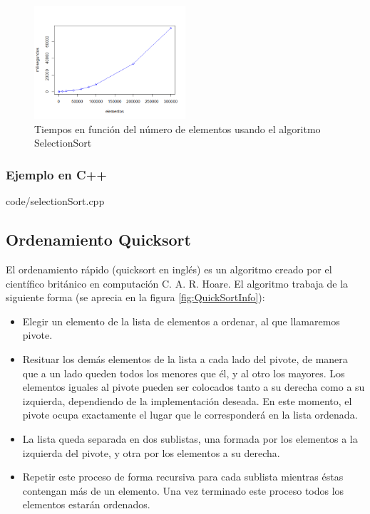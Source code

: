 \documentclass[8pt, A4]{article}    %
\newcommand{\grisclaro}{\color[gray]{0.99}}
\newcommand{\showprog}[1]
{
\begin{minipage}{\textwidth}

 {code/#1}
\end{minipage} 
}
\begin{document}
\begin{figure}[h]
\begin{center}
\includegraphics[width=0.5\textwidth]{graph/selectionSortTime}
\end{center}
\caption{Tiempos en función del número de elementos usando el algoritmo SelectionSort}
\label{fig:selectionSortTime}
\end{figure}

\subsubsection{Ejemplo en C++}

\showprog{selectionSort.cpp}

\newpage


\subsection{Ordenamiento Quicksort}
El ordenamiento rápido (quicksort en inglés) es un algoritmo creado por el científico británico en computación C. A. R. Hoare.
El algoritmo trabaja de la siguiente forma (se aprecia en la figura \ref{fig:QuickSortInfo}):

\begin{itemize}
    \item Elegir un elemento de la lista de elementos a ordenar, al que llamaremos pivote.
    \item Resituar los demás elementos de la lista a cada lado del pivote, de manera que a un lado queden todos los menores que él, y al otro los mayores. Los elementos iguales al pivote pueden ser colocados tanto a su derecha como a su izquierda, dependiendo de la implementación deseada. En este momento, el pivote ocupa exactamente el lugar que le corresponderá en la lista ordenada.
    \item La lista queda separada en dos sublistas, una formada por los elementos a la izquierda del pivote, y otra por los elementos a su derecha.
    \item Repetir este proceso de forma recursiva para cada sublista mientras éstas contengan más de un elemento. Una vez terminado este proceso todos los elementos estarán ordenados.
\end{itemize}
\end{document}
